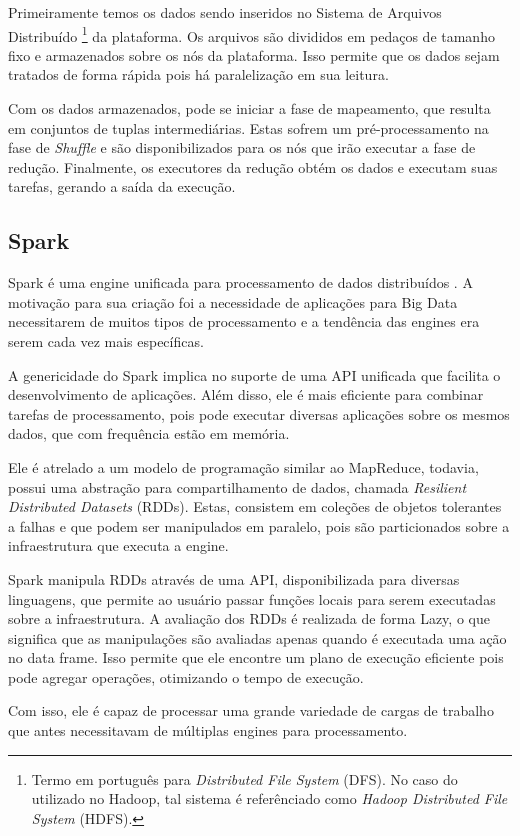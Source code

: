 Primeiramente temos os dados sendo inseridos no Sistema de Arquivos Distribuído 
\footnote{Termo em português para \emph{Distributed File System} (DFS). No caso 
do utilizado no Hadoop, tal sistema é referênciado como \emph{Hadoop Distributed 
File System} (HDFS).} da plataforma. Os arquivos são divididos em pedaços de 
tamanho fixo e armazenados sobre os nós da plataforma. Isso permite que os dados 
sejam tratados de forma rápida pois há paralelização em sua leitura.

Com os dados armazenados, pode se iniciar a fase de mapeamento, que resulta em 
conjuntos de tuplas intermediárias. Estas sofrem um pré-processamento na fase 
de \emph{Shuffle} e são disponibilizados para os nós que irão executar a fase 
de redução. Finalmente, os executores da redução obtém os dados e executam suas 
tarefas, gerando a saída da execução.

\subsection{Spark} \label{ref:spark}

Spark é uma engine unificada para processamento de dados distribuídos 
\cite{ref:spark}. A motivação para sua criação foi a necessidade de aplicações 
para Big Data necessitarem de muitos tipos de processamento e a tendência das 
engines era serem cada vez mais específicas. 

A genericidade do Spark implica no suporte de uma API unificada que facilita o 
desenvolvimento de aplicações. Além disso, ele é mais eficiente para combinar 
tarefas de processamento, pois pode executar diversas aplicações sobre os 
mesmos dados, que com frequência estão em memória.

Ele é atrelado a um modelo de programação similar ao MapReduce, todavia, possui 
uma abstração para compartilhamento de dados, chamada \emph{Resilient 
Distributed Datasets} (RDDs). Estas, consistem em coleções de objetos 
tolerantes a falhas e que podem ser manipulados em paralelo, pois são 
particionados sobre a infraestrutura que executa a engine. 

Spark manipula RDDs através de uma API, disponibilizada para diversas 
linguagens, que permite ao usuário passar funções locais para serem executadas 
sobre a infraestrutura. A avaliação dos RDDs é realizada de forma Lazy, o que 
significa que as manipulações são avaliadas apenas quando é executada uma ação 
no data frame. Isso permite que ele encontre um plano de execução eficiente 
pois pode agregar operações, otimizando o tempo de execução.

Com isso, ele é capaz de processar uma grande variedade de cargas de 
trabalho que antes necessitavam de múltiplas engines para processamento.





